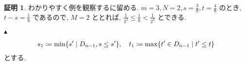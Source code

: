 \documentclass[10pt, fleqn, label-section=none]{bxjsarticle}
\theoremstyle{definition}
\newtheorem*{pf*}{証明}
\newcommand{\cbra}[1]{\mleft\{#1\mright\}}
\renewcommand{\;}{\, ; \,}
\newenvironment{claim}[1]{\par\noindent\underline{step:}\space#1}{}
\newenvironment{claimproof}[1]{\par\noindent{($\because$)}\space#1}{\hfill $\blacktriangle $}
\begin{document}
\begin{pf*}
\begin{claimproof}
わかりやすく例を観察するに留める. $m = 3, N = 2, s = \frac{3}{8}, t = \frac{4}{8}$ のとき, $t - s = \frac{1}{8} $ であるので, $M = 2$ ととれば, $\frac{1}{2^3} \leq \frac{1}{8} < \frac{1}{2^2}$ とできる. 

\end{claimproof}

\begin{align*} s_1 \coloneqq \min \cbra{s^\prime \mid D_{n-1}, s \leq s^\prime }, \quad t_1 \coloneqq \max \cbra{t^\prime \in D_{n-1} \mid t^\prime \leq t} \end{align*}
とする.


\end{pf*}
\end{document}
